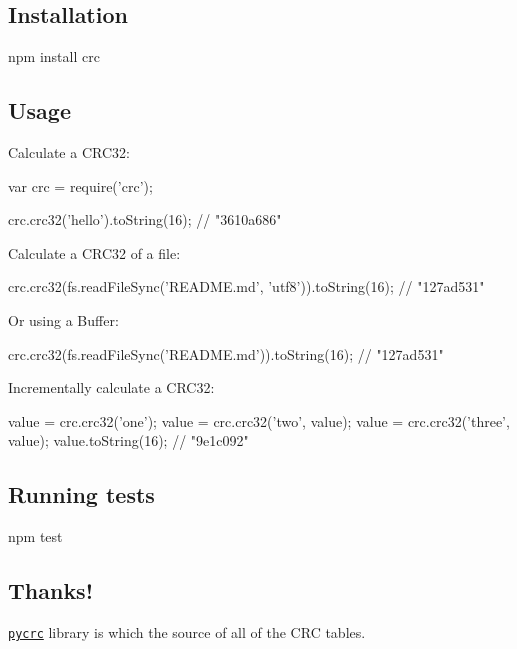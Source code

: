 \subsection*{Installation}


\begin{DoxyCode}
npm install crc
\end{DoxyCode}


\subsection*{Usage}

Calculate a C\+R\+C32\+:


\begin{DoxyCode}
var crc = require('crc');

crc.crc32('hello').toString(16);
// "3610a686"
\end{DoxyCode}


Calculate a C\+R\+C32 of a file\+:


\begin{DoxyCode}
crc.crc32(fs.readFileSync('README.md', 'utf8')).toString(16);
// "127ad531"
\end{DoxyCode}


Or using a {\ttfamily Buffer}\+:


\begin{DoxyCode}
crc.crc32(fs.readFileSync('README.md')).toString(16);
// "127ad531"
\end{DoxyCode}


Incrementally calculate a C\+R\+C32\+:


\begin{DoxyCode}
value = crc.crc32('one');
value = crc.crc32('two', value);
value = crc.crc32('three', value);
value.toString(16);
// "9e1c092"
\end{DoxyCode}


\subsection*{Running tests}


\begin{DoxyCode}
npm test
\end{DoxyCode}


\subsection*{Thanks!}

\href{http://www.tty1.net/pycrc/}{\tt pycrc} library is which the source of all of the C\+RC tables.

